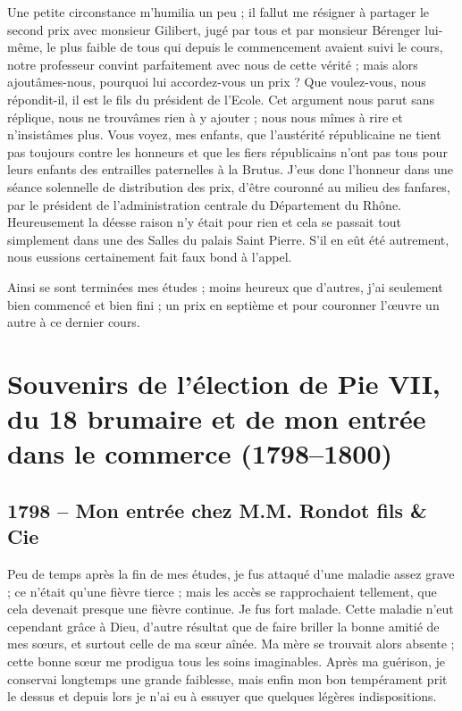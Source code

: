 \documentclass[11pt,a4paper]{report}
\begin{document}
Une petite circonstance m'humilia un peu ; il fallut me résigner à partager le second prix avec monsieur Gilibert, jugé par tous et par monsieur Bérenger lui-même, le plus faible de tous qui depuis le commencement avaient suivi le cours, notre professeur convint parfaitement avec nous de cette vérité ; mais alors ajoutâmes-nous, pourquoi lui accordez-vous un prix ? Que voulez-vous, nous répondit-il, il est le fils du président de l'Ecole. Cet argument nous parut sans réplique, nous ne trouvâmes rien à y ajouter ; nous nous mîmes à rire et n'insistâmes plus. Vous voyez, mes enfants, que l'austérité républicaine ne tient pas toujours contre les honneurs et que les fiers républicains n'ont pas tous pour leurs enfants des entrailles paternelles à la Brutus. J'eus donc l'honneur dans une séance solennelle de distribution des prix, d'être couronné au milieu des fanfares, par le président de l'administration centrale du Département du Rhône. Heureusement la déesse raison n'y était pour rien et cela se passait tout simplement dans une des Salles du palais Saint Pierre. S'il en eût été autrement, nous eussions certainement fait faux bond à l'appel.

Ainsi se sont terminées mes études ; moins heureux que d'autres, j'ai seulement bien commencé et bien fini ; un prix en septième et pour couronner l'œuvre un autre à ce dernier cours.

\chapter{Souvenirs de l'élection de Pie VII, du 18 brumaire et de mon entrée dans le commerce (1798--1800)}

\section*{1798 -- Mon entrée chez M.M. Rondot fils \& Cie}

Peu de temps après la fin de mes études, je fus attaqué d'une maladie assez grave ; ce n'était qu'une fièvre tierce ; mais les accès se rapprochaient tellement, que cela devenait presque une fièvre continue. Je fus fort malade. Cette maladie n'eut cependant grâce à Dieu, d'autre résultat que de faire briller la bonne amitié de mes sœurs, et surtout celle de ma sœur aînée. Ma mère se trouvait alors absente ; cette bonne sœur me prodigua tous les soins imaginables. Après ma guérison, je conservai longtemps une grande faiblesse, mais enfin mon bon tempérament prit le dessus et depuis lors je n'ai eu à essuyer que quelques légères indispositions.
\end{document}

